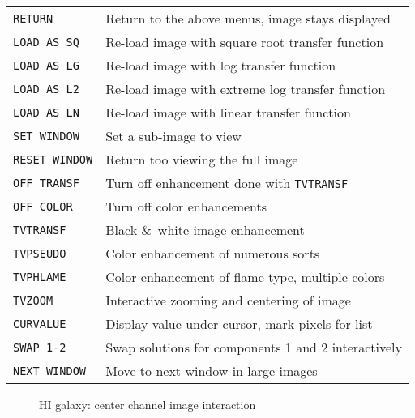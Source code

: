 \documentclass[twoside]{article}
\newcommand{\Me}[1]{\textcolor{mecol}{#1}}
\newcommand{\putfig}[1]{\texttt{[image: \#1.eps]}}
\begin{document}
\vfill\eject
\begin{center}
\begin{tabular}{|l|l|}\hline
 {\tt RETURN     } & Return to the above menus, image stays displayed\\
 {\tt LOAD AS SQ } & Re-load image with square root transfer function\\
 {\tt LOAD AS LG } & Re-load image with log transfer function\\
 {\tt LOAD AS L2 } & Re-load image with extreme log transfer function\\
 {\tt LOAD AS LN } & Re-load image with linear transfer function\\
\Me{{\tt SET WINDOW}} & \Me{Set a sub-image to view}\\
\Me{{\tt RESET WINDOW}} & \Me{Return too viewing the full image}\\
 {\tt OFF TRANSF } & Turn off enhancement done with {\tt TVTRANSF}\\
 {\tt OFF COLOR  } & Turn off color enhancements\\
 {\tt TVTRANSF   } & Black \&\ white image enhancement\\
 {\tt TVPSEUDO   } & Color enhancement of numerous sorts\\
 {\tt TVPHLAME   } & Color enhancement of flame type, multiple colors\\
 {\tt TVZOOM     } & Interactive zooming and centering of image\\
 {\tt CURVALUE   } & Display value under cursor, mark pixels for list\\
 {\tt SWAP 1-2   } & Swap solutions for components 1 and 2 interactively\\
 {\tt NEXT WINDOW} & Move to next window in large images\\ \hline
\end{tabular}
\end{center}

\begin{figure}
\begin{center}
\resizebox{6.0in}{!}{\putfig{XGAUS.HIcent}}
\caption{HI galaxy: center channel image interaction}
\label{fig:XGAUS.HIcent}
\end{center}
\end{figure}

\end{document}
